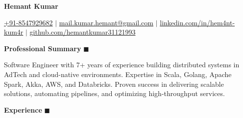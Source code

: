 \documentclass[9pt]{extletter}
\begin{document}
\textbf{\Huge Hemant Kumar}

\href{tel:+91-8547929682}{+91-8547929682} $|$ \href{mailto:mail.kumar.hemant@gmail.com}{mail.kumar.hemant@gmail.com} $|$ \href{https://www.linkedin.com/in/hem4nt-kum4r}{linkedin.com/in/hem4nt-kum4r} $|$ \href{https://github.com/hemantkumar31121993}{github.com/hemantkumar31121993}

\vspace{9pt}
\textbf{\Large Professional Summary} \hrulefill $\blacksquare$

Software Engineer with 7+ years of experience building distributed systems in AdTech and cloud-native environments. Expertise in Scala, Golang, Apache Spark, Akka, AWS, and Databricks. Proven success in delivering scalable solutions, automating pipelines, and optimizing high-throughput services.

\vspace{9pt}
\textbf{\Large Experience} \hrulefill $\blacksquare$
\end{document}
